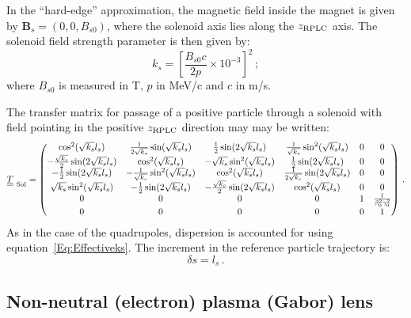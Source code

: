 In the ``hard-edge'' approximation, the magnetic field inside the
magnet is given by $\bm{B}_s = (0, 0, B_{s0})$, where the solenoid axis
lies along the $z_{\rm RPLC}$ axis.
The solenoid field strength parameter is then given by:
\begin{equation}
  k_s = \left[ \frac{B_{s0} c}{2p} \times 10^{-3} \right]^2\,; \label{Eq:Effectiveks}
\end{equation}
where $B_{s0}$ is measured in T, $p$ in MeV/c and $c$ in m/s.

The transfer matrix for passage of a positive particle through a
solenoid with field pointing in the positive $z_{\rm RPLC}$ direction
may may be written: 
\begin{equation}
  \underline{\underline{T}}_{\rm~Sol} =
    \begin{pmatrix}
                           \cos^2(\sqrt{k_s} l_s) &   \frac{1}{2\sqrt{k_s}} \sin(\sqrt{k_s} l_s) &           \frac{1}{2} \sin(2\sqrt{k_s} l_s) & \frac{1}{\sqrt{k_s}} \sin^2(\sqrt{k_s} l_s) & 0 & 0 \\
      -\frac{\sqrt{k_s}}{2} \sin(2\sqrt{k_s} l_s) &                       \cos^2(\sqrt{k_s} l_s) &           -\sqrt{k_s}\sin^2(\sqrt{k_s} l_s) &           \frac{1}{2} \sin(2\sqrt{k_s} l_s) & 0 & 0 \\
               -\frac{1}{2} \sin(2\sqrt{k_s} l_s) & -\frac{1}{\sqrt{k_s}} \sin^2(\sqrt{k_s} l_s) &                      \cos^2(\sqrt{k_s} l_s) & \frac{1}{2\sqrt{k_s}} \sin(2\sqrt{k_s} l_s) & 0 & 0 \\
                \sqrt{k_s} \sin^2(\sqrt{k_s} l_s) &           -\frac{1}{2} \sin(2\sqrt{k_s} l_s) & -\frac{\sqrt{k_s}}{2} \sin(2\sqrt{k_s} l_s) &                      \cos^2(\sqrt{k_s} l_s) & 0 & 0 \\
          0 & 0 & 0 & 0 & 1 & \frac{l}{\beta_0^2 \gamma_0^2} \\
          0 & 0 & 0 & 0 & 0 &                             1
        \end{pmatrix} \, .
\end{equation}
As in the case of the quadrupoles, dispersion is accounted for using
equation~\ref{Eq:Effectiveks}.
The increment in the reference particle trajectory is:
\begin{equation}
  \delta s = l_s \, .
\end{equation}

\subsection{Non-neutral (electron) plasma (Gabor) lens}

